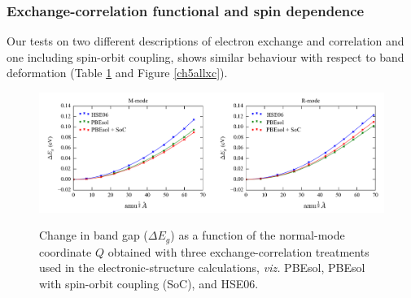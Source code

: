 \subsubsection{Exchange-correlation functional and spin dependence}

Our tests on two different descriptions of electron exchange and correlation and one including spin-orbit coupling, shows similar behaviour with respect to band deformation (Table \ref{Egtheory} and Figure \ref{ch5allxc}). 
 
\begin{figure}[]
\includegraphics[width=\textwidth]{figures/ch5/fig_s4.png} \label{Egtheory}
\caption[Bandgap deformation at three levels of theory]{
Change in band gap ($\Delta E_g$) as a function of the normal-mode coordinate $Q$ obtained with three exchange-correlation treatments used in the electronic-structure calculations, \textit{viz.} PBEsol, PBEsol with spin-orbit coupling (SoC), and HSE06.
}
\end{figure}

